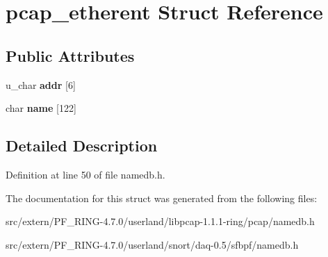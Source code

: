 \hypertarget{structpcap__etherent}{
\section{pcap\_\-etherent Struct Reference}
\label{structpcap__etherent}
}
\subsection*{Public Attributes}
\begin{DoxyCompactItemize}
\item 
\hypertarget{structpcap__etherent_ad06f5e81a50f39cd3aa344461755ff29}{
u\_\-char {\bfseries addr} \mbox{[}6\mbox{]}}
\label{structpcap__etherent_ad06f5e81a50f39cd3aa344461755ff29}

\item 
\hypertarget{structpcap__etherent_aa5b8568959c47f30267130e4474f0154}{
char {\bfseries name} \mbox{[}122\mbox{]}}
\label{structpcap__etherent_aa5b8568959c47f30267130e4474f0154}

\end{DoxyCompactItemize}


\subsection{Detailed Description}


Definition at line 50 of file namedb.h.



The documentation for this struct was generated from the following files:\begin{DoxyCompactItemize}
\item 
src/extern/PF\_\-RING-\/4.7.0/userland/libpcap-\/1.1.1-\/ring/pcap/namedb.h\item 
src/extern/PF\_\-RING-\/4.7.0/userland/snort/daq-\/0.5/sfbpf/namedb.h\end{DoxyCompactItemize}
